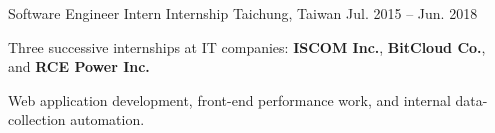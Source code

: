 \begin{cventries}
  \cventry
    {Software Engineer Intern} %
    {Internship} %
    {Taichung, Taiwan} %
    {Jul. 2015 -- Jun. 2018} %
    {
      \begin{cvitems}
        \item {Three successive internships at IT companies: \textbf{ISCOM Inc.}, \textbf{BitCloud Co.}, and \textbf{RCE Power Inc.}}
        \item {Web application development, front-end performance work, and internal data-collection automation.}
       \end{cvitems}
    }
\end{cventries}


